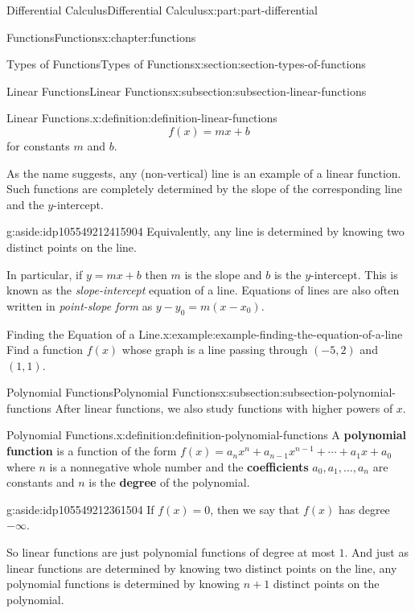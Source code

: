 \documentclass[twoside,10pt,]{book}
\newcommand{\terminology}[1]{\textbf{#1}}
\numberwithin{equation}{part}
\begin{document}
\begin{partptx}{Differential Calculus}{}{Differential Calculus}{}{}{x:part:part-differential}
\begin{chapterptx}{Functions}{}{Functions}{}{}{x:chapter:functions}
\begin{sectionptx}{Types of Functions}{}{Types of Functions}{}{}{x:section:section-types-of-functions}
\begin{subsectionptx}{Linear Functions}{}{Linear Functions}{}{}{x:subsection:subsection-linear-functions}
\begin{definition}{Linear Functions.}{x:definition:definition-linear-functions}
\begin{equation*}
f(x) = mx + b
\end{equation*}
for constants \(m\) and \(b\).%
\end{definition}
As the name suggests, any (non-vertical) line is an example of a linear function. Such functions are completely determined by the slope of the corresponding line and the \(y\)-intercept. \begin{aside}{}{g:aside:idp105549212415904}%
Equivalently, any line is determined by knowing two distinct points on the line.%
\end{aside}
 In particular, if \(y = mx + b\) then \(m\) is the slope and \(b\) is the \(y\)-intercept. This is known as the \emph{slope-intercept} equation of a line. Equations of lines are also often written in \emph{point-slope form} as \(y - y_{0} = m(x - x_{0})\).%
\begin{example}{Finding the Equation of a Line.}{x:example:example-finding-the-equation-of-a-line}%
Find a function \(f(x)\) whose graph is a line passing through \((-5,2)\) and \((1,1)\).%
\end{example}
\end{subsectionptx}
%
%
\typeout{************************************************}
\typeout{************************************************}
%
\begin{subsectionptx}{Polynomial Functions}{}{Polynomial Functions}{}{}{x:subsection:subsection-polynomial-functions}
After linear functions, we also study functions with higher powers of \(x\).%
\begin{definition}{Polynomial Functions.}{x:definition:definition-polynomial-functions}%
%
A \terminology{polynomial function} is a function of the form \(f(x) = a_{n}x^{n} + a_{n-1}x^{n-1} + \cdots + a_{1}x + a_{0}\) where \(n\) is a nonnegative whole number and the \terminology{coefficients} \(a_{0}, a_{1},\ldots, a_{n}\) are constants and \(n\) is the \terminology{degree} of the polynomial.%
\end{definition}
\begin{aside}{}{g:aside:idp105549212361504}%
If \(f(x) = 0\), then we say that \(f(x)\) has degree \(-\infty\).%
\end{aside}
So linear functions are just polynomial functions of degree at most \(1\). And just as linear functions are determined by knowing two distinct points on the line, any polynomial functions is determined by knowing \(n+1\) distinct points on the polynomial.%

\end{subsectionptx}
\end{sectionptx}
\end{chapterptx}
\end{partptx}
\end{document}
